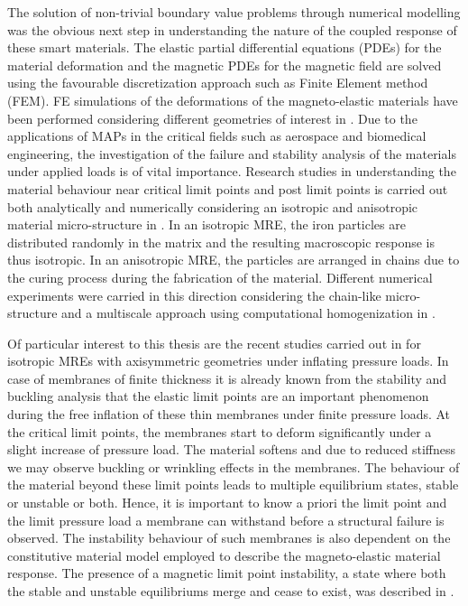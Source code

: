 The solution of non-trivial boundary value problems through numerical modelling was the obvious next step in understanding the nature of the coupled response of these smart materials. The elastic partial differential equations (PDEs) for the material deformation and the magnetic PDEs for the magnetic field are solved using the favourable discretization approach such as Finite Element method (FEM). FE simulations of the deformations of the magneto-elastic materials have been performed considering different geometries of interest in \cite{barham, bustamante2011numerical, Vogel2014}. Due to the applications of MAPs in the critical fields such as aerospace and biomedical engineering, the investigation of the failure and stability analysis of the materials under applied loads is of vital importance. Research studies in understanding the material behaviour near critical limit points and post limit points is carried out both analytically and numerically considering an isotropic and anisotropic material micro-structure in \cite{rudykh2013stability, reddy_toroid, Reddy2018, Barham2008, Miehe2015}. In an isotropic MRE, the iron particles are distributed randomly in the matrix and the resulting macroscopic response is thus isotropic. In an anisotropic MRE, the particles are arranged in chains due to the curing process during the fabrication of the material. Different numerical experiments were carried in this direction considering the chain-like micro-structure \cite{Saxena2015} and a multiscale approach using computational homogenization in \cite{keip2016multiscale}. \par 
Of particular interest to this thesis are the recent studies carried out in \cite{reddy_toroid, Reddy2018} for isotropic MREs with axisymmetric geometries under inflating pressure loads. In case of membranes of finite thickness it is already known from the stability and buckling analysis that the elastic limit points are an important phenomenon during the free inflation of these thin membranes under finite pressure loads. At the critical limit points, the membranes start to deform significantly under a slight increase of pressure load. The material softens and due to reduced stiffness we may observe buckling or wrinkling effects in the membranes. The behaviour of the material beyond these limit points leads to multiple equilibrium states, stable or unstable or both. Hence, it is important to know a priori the limit point and the limit pressure load a membrane can withstand before a structural failure is observed. The instability behaviour of such membranes is also dependent on the constitutive material model employed to describe the magneto-elastic material response. The presence of a magnetic limit point instability, a state where both the stable and unstable equilibriums merge and cease to exist, was described in \cite{Barham2008, reddy_toroid}. \par 
